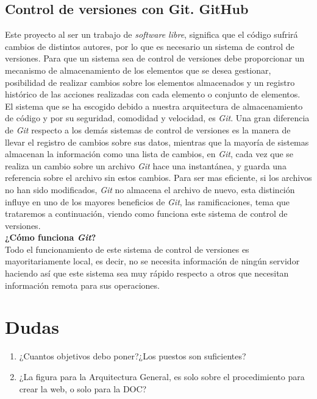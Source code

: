 \documentclass[a4paper, 12pt]{book}
\begin{document}
\section{Control de versiones con Git. GitHub}
\label{sec:git}
Este proyecto al ser un trabajo de \emph{software libre}, significa que el código sufrirá cambios de distintos autores, por lo que es necesario un sistema de control de versiones. Para que un sistema sea de control de versiones debe proporcionar un mecanismo de almacenamiento de los elementos que se desea gestionar, posibilidad de realizar cambios sobre los elementos almacenados y un registro histórico de las acciones realizadas con cada elemento o conjunto de elementos. \\
El sistema que se ha escogido debido a nuestra arquitectura de almacenamiento de código y por su seguridad, comodidad y velocidad, es \emph{Git}. Una gran diferencia de \emph{Git} respecto a los demás sistemas de control de versiones es la manera de llevar el registro de cambios sobre sus datos, mientras que la mayoría de sistemas almacenan la información como una lista de cambios, en \emph{Git}, cada vez que se realiza un cambio sobre un archivo \emph{Git} hace una instantánea, y guarda una referencia sobre el archivo sin estos cambios. Para ser mas eficiente, si los archivos no han sido modificados, \emph{Git} no almacena el archivo de nuevo, esta distinción influye en uno de los mayores beneficios de \emph{Git}, las ramificaciones, tema que trataremos a continuación, viendo como funciona este sistema de control de versiones. \\
\textbf{¿Cómo funciona \emph{Git}?}\\
Todo el funcionamiento de este sistema de control de versiones es mayoritariamente local, es decir, no se necesita información de ningún servidor haciendo así que este sistema sea muy rápido respecto a otros que necesitan información remota para sus operaciones. 


\chapter*{Dudas}
\begin{enumerate}
    \item ¿Cuantos objetivos debo poner?¿Los puestos son suficientes?
    \item ¿La figura para la Arquitectura General, es solo sobre el procedimiento para crear la web, o solo para la DOC?
\end{enumerate}
\end{document}

